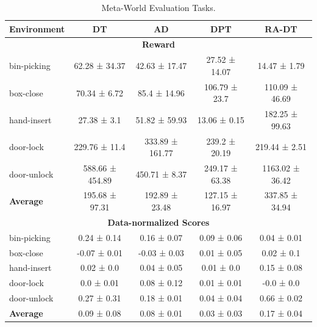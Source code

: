 \documentclass{article}
\begin{document}
\begin{table}[h]
    \centering
    \caption{Meta-World Evaluation Tasks.}
\begin{tabular}{lcccc}
    \toprule
    \textbf{Environment} &  \textbf{DT} & \textbf{AD} & \textbf{DPT} & \textbf{RA-DT} \\
    \midrule
    \multicolumn{5}{c}{\textbf{Reward}} \\
bin-picking        &           62.28 ± 34.37 &          42.63 ± 17.47 &           27.52 ± 14.07 &          14.47 ± 1.79 \\
box-close          &            70.34 ± 6.72 &           85.4 ± 14.96 &           106.79 ± 23.7 &        110.09 ± 46.69 \\
hand-insert        &             27.38 ± 3.1 &          51.82 ± 59.93 &            13.06 ± 0.15 &        182.25 ± 99.63 \\
door-lock          &           229.76 ± 11.4 &        333.89 ± 161.77 &           239.2 ± 20.19 &         219.44 ± 2.51 \\
door-unlock        &         588.66 ± 454.89 &          450.71 ± 8.37 &          249.17 ± 63.38 &       1163.02 ± 36.42 \\
\textbf{Average}                            &          195.68 ± 97.31 &         192.89 ± 23.48 &          127.15 ± 16.97 &        337.85 ± 34.94 \\
\midrule
\multicolumn{5}{c}{\textbf{Data-normalized Scores}} \\
bin-picking &             0.24 ± 0.14 &            0.16 ± 0.07 &             0.09 ± 0.06 &           0.04 ± 0.01 \\
box-close   &            -0.07 ± 0.01 &           -0.03 ± 0.03 &             0.01 ± 0.05 &            0.02 ± 0.1 \\
hand-insert &              0.02 ± 0.0 &            0.04 ± 0.05 &              0.01 ± 0.0 &           0.15 ± 0.08 \\
door-lock   &              0.0 ± 0.01 &            0.08 ± 0.12 &             0.01 ± 0.01 &            -0.0 ± 0.0 \\
door-unlock &             0.27 ± 0.31 &            0.18 ± 0.01 &             0.04 ± 0.04 &           0.66 ± 0.02 \\
\textbf{Average}                              &             0.09 ± 0.08 &            0.08 ± 0.01 &             0.03 ± 0.03 &           0.17 ± 0.04 \\
\bottomrule
\end{tabular}
\label{tab:metaworld-eval}
\end{table}
\end{document}
